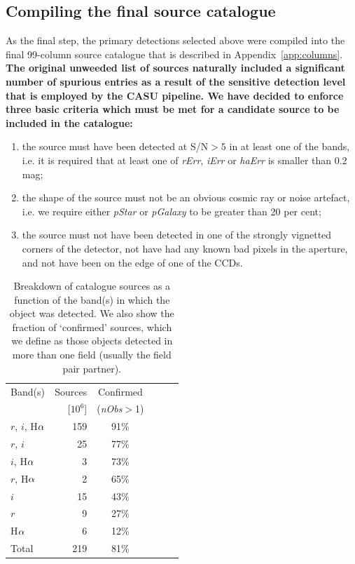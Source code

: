 \documentclass[a4paper,useAMS,usenatbib]{mn2e}
\def\ha{\mbox{H$\rm \alpha$}}
\begin{document}
\subsection{Compiling the final source catalogue}

As the final step, the primary detections
selected above were compiled
into the final 99-column source catalogue
that is described in Appendix~\ref{app:columns}.
{ \bf
The original unweeded list of sources naturally included 
a significant number of spurious entries
as a result of the sensitive detection level
that is employed by the CASU pipeline.
We have decided to enforce three basic criteria
which must be met for a candidate source
to be included in the catalogue:}
\begin{enumerate}
\item the source must have been detected at S/N$>5$ in at least
one of the bands, i.e. it is required that at least one of
\emph{rErr}, \emph{iErr} or \emph{haErr} is smaller
than 0.2 mag;
\item the shape of the source must not be an obvious
cosmic ray or noise artefact, i.e. we require
either \emph{pStar} or \emph{pGalaxy} to be
greater than 20 per cent;
\item the source must not have been detected in one of the strongly
vignetted corners of the detector, 
not have had any known bad pixels in the aperture,
and not have been on the edge of one of the CCDs.
\end{enumerate}

\begin{table}
    \caption{Breakdown of catalogue sources as a function of the band(s)
             in which the object was detected.
             We also show the fraction of `confirmed' sources,
             which we define as those objects
             detected in more than one field
             (usually the field pair partner).}
    \label{tbl:detections}
    \begin{center}
        \begin{tabular}{lrcccc}
        \toprule
        Band(s) & Sources & Confirmed \\
        & [$10^6$] & (\emph{nObs}$>$1) \\
        \midrule
        $r$, $i$, \ha & 159 & 91\% \\
        $r$, $i$ & 25 & 77\% \\
        $i$, \ha & 3 & 73\% \\
        $r$, \ha & 2 & 65\% \\
        $i$ & 15 & 43\% \\
        $r$ & 9 & 27\% \\
        \ha & 6 & 12\% \\
        \midrule
        Total  & 219 & 81\% \\
        \bottomrule
        \end{tabular}
	\end{center}
\end{table}
\end{document}
